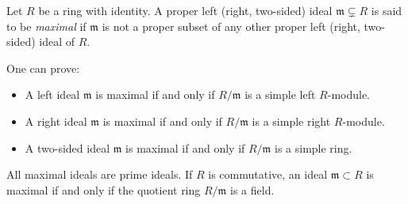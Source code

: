 \documentclass[12pt]{article}
\begin{document}
Let $R$ be a ring with identity. A proper left (right, two-sided) ideal $\mathfrak{m} \subsetneq R$ is said to be {\em maximal} if $\mathfrak{m}$ is not a proper subset of any other proper left (right, two-sided) ideal of $R$.

One can prove:
\begin{itemize}
\item A left ideal $\mathfrak{m}$ is maximal if and only if $R/\mathfrak{m}$ is a simple left $R$-module.
\item A right ideal $\mathfrak{m}$ is maximal if and only if $R/\mathfrak{m}$ is a simple right $R$-module.

\item A two-sided ideal $\mathfrak{m}$ is maximal if and only if $R/\mathfrak{m}$ is a simple ring.
\end{itemize}

All maximal ideals are prime ideals. If $R$ is commutative, an ideal $\mathfrak{m} \subset R$ is maximal if and only if the quotient ring $R/\mathfrak{m}$ is a field.
\end{document}

